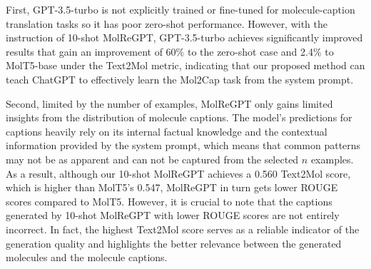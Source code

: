 \documentclass{article}
\theoremstyle{plain}
\theoremstyle{definition}
\theoremstyle{remark}
\begin{document}
\begin{table*}[htb]
    \centering
        \caption{Text-based molecule generation results on CheBI-20. Experimental results for Transformer, T5-base, and MolT5-base are retrieved from \cite{edwards-etal-2022-translation}. The \textbf{best} scores are in bold, and the \underline{second-best} scores are underlined.}
    \label{tab:c2m}

\end{table*}

First, GPT-3.5-turbo is not explicitly trained or fine-tuned for molecule-caption translation tasks so it has poor zero-shot performance. 
However, with the instruction of 10-shot MolReGPT, GPT-3.5-turbo achieves significantly improved results that gain an improvement of 60\% to the zero-shot case and 2.4\% to MolT5-base under the Text2Mol metric, indicating that our proposed method can teach ChatGPT to effectively learn the Mol2Cap task from the system prompt. 

Second, limited by the number of examples, MolReGPT only gains limited insights from the distribution of molecule captions.
The model's predictions for captions heavily rely on its internal factual knowledge and the contextual information provided by the system prompt, which means that common patterns may not be as apparent and can not be captured from the selected $n$ examples. 
As a result, although our 10-shot MolReGPT achieves a 0.560 Text2Mol score, which is higher than MolT5's 0.547, MolReGPT in turn gets lower ROUGE scores compared to MolT5.
However, it is crucial to note that the captions generated by 10-shot MolReGPT with lower ROUGE scores are not entirely incorrect. 
In fact, the highest Text2Mol score serves as a reliable indicator of the generation quality and highlights the better relevance between the generated molecules and the molecule captions.
\end{document}
